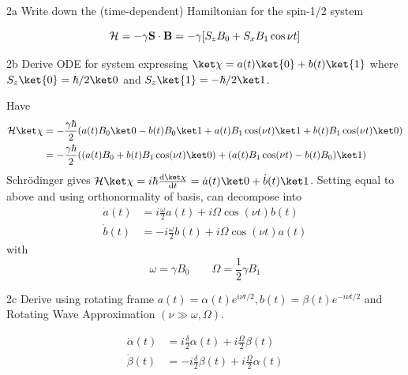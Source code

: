 \documentclass[12pt]{article}
\newcommand{\HH}{\mathcal{H}}
\begin{document}

\newpage 
\begin{exc}{2a}
    Write down the (time-dependent) Hamiltonian for the spin-1/2 system
\end{exc}
\begin{ans}
\[\HH = - \gamma \vb S \cdot \vb B = -\gamma[S_z B_0 + S_x B_1 \cos \nu t]\]
\end{ans}

\begin{exc}{2b}
    Derive ODE for system expressing $\ket \chi = a(t) \ket{0} + b(t) \ket{1}$ where $S_z \ket{0} = \hbar/2 \ket 0$ and $S_z \ket{1} = -\hbar/2 \ket 1$.
\end{exc}
\begin{ans}
    Have 
    \begin{align*}
        \HH \ket \chi 
        &= -\frac{\gamma \hbar}{2}(a(t)B_0 \ket 0 - b(t) B_0\ket 1 + a(t)B_1 \cos (\nu t)\ket 1  + b(t)B_1 \cos(\nu t)\ket 0)\\
        &= -\frac{\gamma \hbar}{2}((a(t)B_0 + b(t)B_1 \cos(\nu t)\ket 0 ) + (a(t)B_1 \cos(\nu t) - b(t)B_0)\ket 1 )
    \end{align*}
    Schrödinger gives $\HH \ket \chi = i\hbar \odv{\ket \chi}{t} = \dot a(t) \ket 0 + \dot b(t) \ket 1$. Setting equal to above and using orthonormality of basis, can decompose into 
    \begin{align}
     \dot a(t) &= i\frac{\omega}{2} a(t) + i\Omega \cos(\nu t)b(t)\\ 
    \dot b(t) &= -i \frac{\omega}{2} b(t) + i \Omega \cos(\nu t)a(t)
    \end{align}
    with 
    \[\boxed{\omega = \gamma B_0} \qquad \boxed{\Omega = \frac12\gamma B_1}\]
\end{ans}
\begin{exc}{2c}
    Derive using rotating frame $a(t) = \alpha(t)e^{i\nu t/2}, b(t) = \beta(t)e^{-i\nu t/2}$ and Rotating Wave Approximation $(\nu \gg \omega, \Omega)$.
\end{exc}
\begin{ans}
    \begin{align}
        \dot\alpha(t) &= i\frac{\delta}2\alpha(t) + i \frac{\Omega}2 \beta(t) \\ 
        \dot \beta (t) &= -i\frac{\delta}2\beta(t) + i \frac{\Omega}2 \alpha(t)
    \end{align}
\end{ans}
\end{document}
